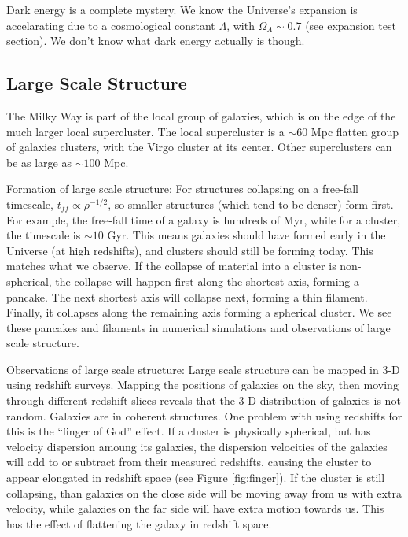 Dark energy is a complete mystery.  We know the Universe's expansion is 
accelarating due to a cosmological constant $\Lambda$, with 
$\Omega_{\Lambda}\sim0.7$ (see expansion test section).  We don't know what 
dark energy actually is though.  

\subsection{Large Scale Structure}
The Milky Way is part of the local group of galaxies, which is on the edge 
of the much larger local supercluster.  The local supercluster is a $\sim60$ 
Mpc flatten group of galaxies clusters, with the Virgo cluster at its center.  
Other superclusters can be as large as $\sim100$ Mpc.  

Formation of large scale structure:\newline
For structures collapsing on a free-fall timescale, $t_{ff}\propto\rho^{-1/2}$, 
so smaller structures (which tend to be denser) form first.  For example, 
the free-fall time of a galaxy is hundreds of Myr, while for a cluster, the 
timescale is $\sim10$ Gyr.  This means galaxies should have formed early in the 
Universe (at high redshifts), and clusters should still be forming today.  This 
matches what we observe.  If the collapse of material into a cluster is 
non-spherical, the collapse will happen first along the shortest axis, forming 
a pancake.  The next shortest axis will collapse next, forming a thin 
filament.  Finally, it collapses along the remaining axis forming a spherical 
cluster.  We see these pancakes and filaments in numerical simulations and 
observations of large scale structure.  

Observations of large scale structure:\newline
Large scale structure can be mapped in 3-D using redshift surveys.  Mapping 
the positions of galaxies on the sky, then moving through different redshift 
slices reveals that the 3-D distribution of galaxies is not random.  Galaxies 
are in coherent structures.  One problem with using redshifts for this is 
the ``finger of God'' effect.  If a cluster is physically spherical, but has 
velocity dispersion amoung its galaxies, the dispersion velocities of the 
galaxies will add to or subtract from their measured redshifts, causing the 
cluster to appear elongated in redshift space (see Figure \ref{fig:finger}).  
If the cluster is still collapsing, than galaxies on the close side will 
be moving away from us with extra velocity, while galaxies on the far side 
will have extra motion towards us.  This has the effect of flattening 
the galaxy in redshift space.  

